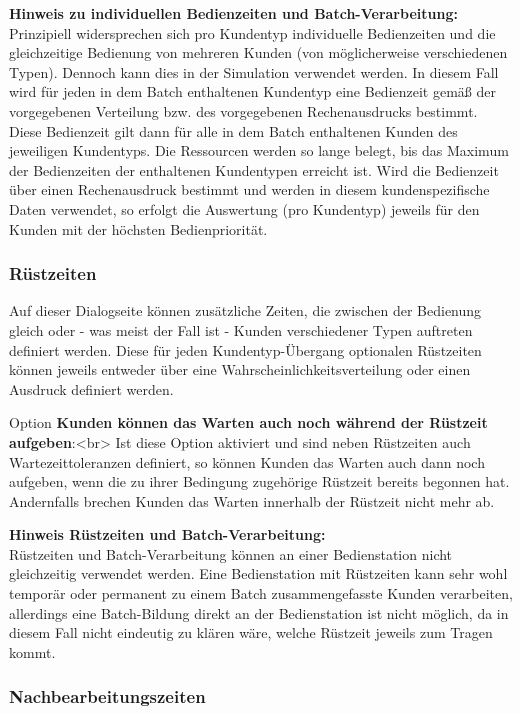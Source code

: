 \textbf{Hinweis zu individuellen Bedienzeiten und Batch-Verarbeitung:}~\\
Prinzipiell widersprechen sich pro Kundentyp individuelle Bedienzeiten und die gleichzeitige Bedienung von mehreren Kunden
(von möglicherweise verschiedenen Typen). Dennoch kann dies in der Simulation verwendet werden. In diesem Fall wird für jeden
in dem Batch enthaltenen Kundentyp eine Bedienzeit gemäß der vorgegebenen Verteilung bzw. des vorgegebenen Rechenausdrucks bestimmt.
Diese Bedienzeit gilt dann für alle in dem Batch enthaltenen Kunden des jeweiligen Kundentyps. Die Ressourcen werden so lange belegt,
bis das Maximum der Bedienzeiten der enthaltenen Kundentypen erreicht ist. Wird die Bedienzeit über einen Rechenausdruck bestimmt
und werden in diesem kundenspezifische Daten verwendet, so erfolgt die Auswertung (pro Kundentyp) jeweils für den Kunden mit der
höchsten Bedienpriorität.

\subsubsection*{Rüstzeiten}

Auf dieser Dialogseite können zusätzliche Zeiten, die zwischen der Bedienung gleich oder - was meist der Fall ist -
Kunden verschiedener Typen auftreten definiert werden. Diese für jeden Kundentyp-Übergang optionalen Rüstzeiten
können jeweils entweder über eine Wahrscheinlichkeitsverteilung oder einen Ausdruck definiert werden.

Option \textbf{Kunden können das Warten auch noch während der Rüstzeit aufgeben}:<br>
Ist diese Option aktiviert und sind neben Rüstzeiten auch Wartezeittoleranzen definiert,
so können Kunden das Warten auch dann noch aufgeben, wenn die zu ihrer Bedingung zugehörige
Rüstzeit bereits begonnen hat. Andernfalls brechen Kunden das Warten innerhalb der Rüstzeit
nicht mehr ab.

\textbf{Hinweis Rüstzeiten und Batch-Verarbeitung:}~\\
Rüstzeiten und Batch-Verarbeitung können an einer Bedienstation nicht gleichzeitig
verwendet werden. Eine Bedienstation mit Rüstzeiten kann sehr wohl temporär oder permanent
zu einem Batch zusammengefasste Kunden verarbeiten, allerdings eine Batch-Bildung direkt an
der Bedienstation ist nicht möglich, da in diesem Fall nicht eindeutig zu klären wäre,
welche Rüstzeit jeweils zum Tragen kommt.

\subsubsection*{Nachbearbeitungszeiten}

